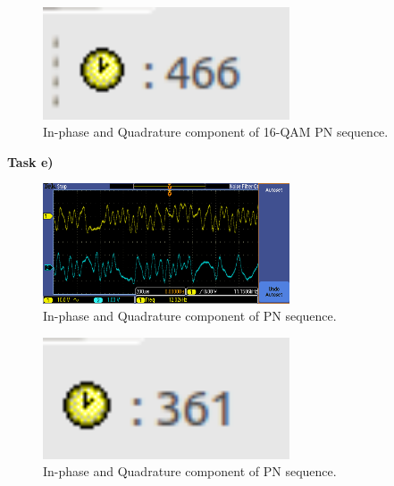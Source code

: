 \documentclass{article}
\begin{document}
\begin{figure}[h]
  \begin{center}
    \includegraphics[width=0.65\textwidth]{img/task_d_profile.png}
    \caption{In-phase and Quadrature component of 16-QAM PN sequence.}
  \end{center}
\end{figure}

\pagebreak

\pagebreak
\textbf{Task e)}

\begin{figure}[h]
  \begin{center}
    \includegraphics[width=0.65\textwidth]{img/task_e_oscilloscope.png}
    \caption{In-phase and Quadrature component of PN sequence.}
  \end{center}
\end{figure}

\begin{figure}[h]
  \begin{center}
    \includegraphics[width=0.65\textwidth]{img/task_e_profile.png}
    \caption{In-phase and Quadrature component of PN sequence.}
  \end{center}
\end{figure}
\end{document}
